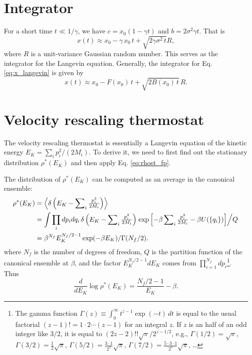 \documentclass[11pt]{article}
\begin{document}
\section{\label{sec:int0}Integrator}



For a short time $t \ll 1/\gamma$,
we have $c = x_0 (1 - \gamma t)$
and $b = 2 \sigma^2 \gamma t$.
That is
\[
  x(t)
\approx
  x_0 - \gamma \, x_0 \, t
  + \sqrt{ 2 \gamma \sigma^2 \, t } R,
\]
where $R$ is a unit-variance Gaussian random number.
%
This serves as the integrator for the Langevin equation.
%
Generally, the integrator for Eq. \eqref{eq:x_langevin}
is given by
\begin{equation}
  x(t)
\approx
  x_0 - F(x_0) \, t
  + \sqrt{ 2 B(x_0) \, t } \, R.
  \label{eq:langevin_int0}
\end{equation}



\section{\label{sec:tstat1}Velocity rescaling thermostat}



The velocity rescaling thermostat is essentially
a Langevin equation of the kinetic energy
$E_K = \sum_i p_i^2 / (2 M_i)$.
%
To derive it,
we need to first find out the stationary distribution $\rho^*(E_K)$
and then apply Eq. \eqref{eq:rhost_fp}.

The distribution of $\rho^*(E_K)$ can be computed as
an average in the canonical ensemble:
\begin{align}
\rho^*(E_K)
&=
\left\langle
  \delta\left( E_K - \sum\nolimits_i \tfrac{ p_i^2 }{ 2 M_i } \right)
\right\rangle
\notag \\
&=
\int \prod\limits_i d p_i d q_i \,
\delta\left( E_K - \sum\nolimits_i \tfrac{ p_i^2 }{ 2 M_i } \right)
\left.
\exp\left[
    - \beta \sum\nolimits_i \tfrac{ p_i^2 }{ 2 M_i }
    - \beta U(\{q_i\})
\right] \middle/Q \right.
\notag \\
&=
\beta^{N_f} E_K^{N_f/2 - 1} \exp(-\beta E_K) / \Gamma(N_f/2).
\label{eq:rhost_EK}
\end{align}
%
where $N_f$ is the number of degrees of freedom,
$Q$ is the partition function of the canonical ensemble at $\beta$,
and the factor $E_K^{N_f/2 - 1} d E_K$
comes from $\prod_{i = 1}^{N_f} d p_i$\footnote{
The gamma function $\Gamma(z) \equiv \int_0^\infty t^{z - 1} \exp(-t) \, dt$
  is equal to the usual factorial $(z-1)! = 1 \cdot 2 \cdots (z - 1)$ for an integral $z$.
If $z$ is an half of an odd integer like $3/2$,
  it is equal to $(2 z - 2)!! \sqrt\pi/2^{z - 1/2}$,
e.g., $\Gamma(1/2) = \sqrt\pi$,
$\Gamma(3/2) = \frac 1 2 \sqrt\pi$,
$\Gamma(5/2) = \frac { 3 \cdot 1 } { 2^2 } \sqrt\pi$,
$\Gamma(7/2) = \frac { 5 \cdot 3 \cdot 1 } { 2^3 } \sqrt\pi$,
\dots
}.
%
Thus
\[
\frac d {d E_K} \log \rho^*(E_K)
=
\frac{ N_f/2 - 1 } { E_K } - \beta.
\]
\end{document}

